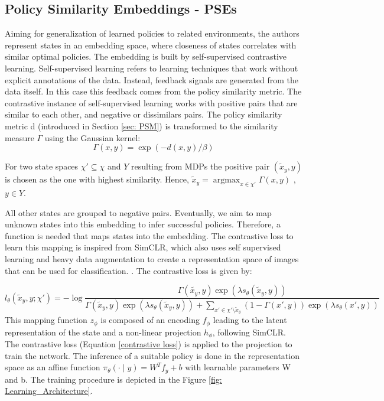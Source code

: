 \documentclass{usiinftr}
\DeclareMathOperator*{\argmax}{argmax}
\begin{document}
\subsection{Policy Similarity Embeddings - PSEs}
Aiming for generalization of learned policies to related environments, the authors represent states in an embedding space, where closeness of states correlates with similar optimal policies. The embedding is built by self-supervised contrastive learning. Self-supervised learning refers to learning techniques that work without explicit annotations of the data. \cite{tian2021understanding} Instead, feedback signals are generated from the data itself. In this case this feedback comes from the policy similarity metric.   The contrastive instance of self-supervised learning works with positive pairs that are similar to each other, and negative or dissimilars pairs. \cite{Hadsell06dimensionalityreduction} The policy similarity metric d (introduced in Section \ref{sec: PSM}) is transformed to the similarity measure $\Gamma$ using the Gaussian kernel:
\begin{equation} \label{Gaussian Kernel}
\Gamma (x,y) = \exp ( -d(x,y)/ \beta) 
\end{equation}

For two state spaces $\chi' \subseteq \chi$ and $Y$ resulting from MDPs the positive pair ${( \tilde{x}_y , y) }$ is chosen as the one with highest similarity. Hence, $ \tilde{x}_y = \argmax_{x \in \chi'} \Gamma (x,y)$ , $y \in Y $.

All other states are grouped to negative pairs. Eventually, we aim to map unknown states into this embedding to infer successful policies. 
Therefore, a function is needed that maps states into the embedding. 
The contrastive loss to learn this mapping is inspired from SimCLR, which also uses self supervised learning and heavy data augmentation to create a representation space of images that can be used for classification. \cite{chen2020simple}. The contrastive loss is given by: 

\begin{equation}\label{contrastive loss}
l_{\theta} (\tilde{x}_y, y; \chi' ) = 
- \log \frac{\Gamma (\tilde{x_y}, y ) \exp(\lambda s_{\theta} (\tilde{x}_y, y))}
{\Gamma(\tilde{x}_y, y) \exp (\lambda s_{\theta}(\tilde{x}_y, y)) + \sum_{x'\in \chi' \setminus {\tilde{x}_y}} (1 - \Gamma (x',y)) \exp (\lambda s_{\theta} (x',y))}
\end{equation}
This mapping function $z_\phi$ is composed of an encoding $f_\phi$ leading to the latent representation of the state and a non-linear projection $h_\phi$, following SimCLR. The contrastive loss (Equation \ref{contrastive loss}) is applied to the projection to train the network. The inference of a suitable policy is done in the representation space as an affine function $\pi_\theta (\cdot \mid y) = W^T f_y + b$
with learnable parameters W and b. The training procedure is depicted in the Figure \ref{fig: Learning_Architecture}.
\end{document}
